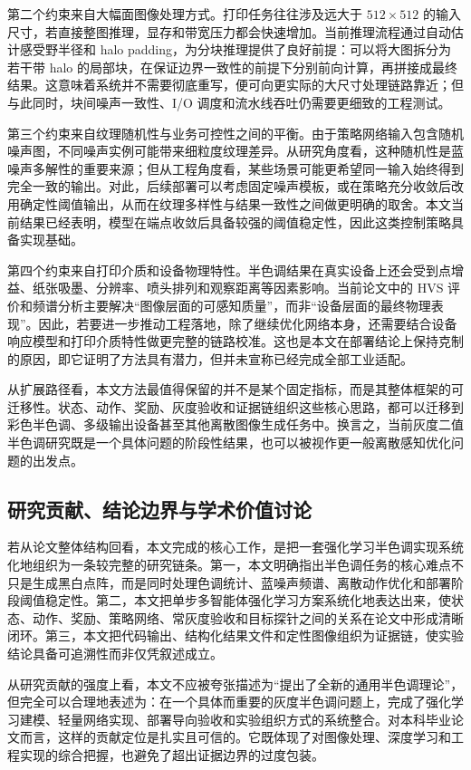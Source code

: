 \documentclass[thesis]{../zstucs-graduation-project}
\begin{document}
第二个约束来自大幅面图像处理方式。打印任务往往涉及远大于 $512\times512$ 的输入尺寸，若直接整图推理，显存和带宽压力都会快速增加。当前推理流程通过自动估计感受野半径和 halo padding，为分块推理提供了良好前提：可以将大图拆分为若干带 halo 的局部块，在保证边界一致性的前提下分别前向计算，再拼接成最终结果。这意味着系统并不需要彻底重写，便可向更实际的大尺寸处理链路靠近；但与此同时，块间噪声一致性、I/O 调度和流水线吞吐仍需要更细致的工程测试。

第三个约束来自纹理随机性与业务可控性之间的平衡。由于策略网络输入包含随机噪声图，不同噪声实例可能带来细粒度纹理差异。从研究角度看，这种随机性是蓝噪声多解性的重要来源；但从工程角度看，某些场景可能更希望同一输入始终得到完全一致的输出。对此，后续部署可以考虑固定噪声模板，或在策略充分收敛后改用确定性阈值输出，从而在纹理多样性与结果一致性之间做更明确的取舍。本文当前结果已经表明，模型在端点收敛后具备较强的阈值稳定性，因此这类控制策略具备实现基础。

第四个约束来自打印介质和设备物理特性。半色调结果在真实设备上还会受到点增益、纸张吸墨、分辨率、喷头排列和观察距离等因素影响。当前论文中的 HVS 评价和频谱分析主要解决“图像层面的可感知质量”，而非“设备层面的最终物理表现”。因此，若要进一步推动工程落地，除了继续优化网络本身，还需要结合设备响应模型和打印介质特性做更完整的链路校准。这也是本文在部署结论上保持克制的原因，即它证明了方法具有潜力，但并未宣称已经完成全部工业适配。

从扩展路径看，本文方法最值得保留的并不是某个固定指标，而是其整体框架的可迁移性。状态、动作、奖励、灰度验收和证据链组织这些核心思路，都可以迁移到彩色半色调、多级输出设备甚至其他离散图像生成任务中。换言之，当前灰度二值半色调研究既是一个具体问题的阶段性结果，也可以被视作更一般离散感知优化问题的出发点。

\subsection{研究贡献、结论边界与学术价值讨论}
若从论文整体结构回看，本文完成的核心工作，是把一套强化学习半色调实现系统化地组织为一条较完整的研究链条。第一，本文明确指出半色调任务的核心难点不只是生成黑白点阵，而是同时处理色调统计、蓝噪声频谱、离散动作优化和部署阶段阈值稳定性。第二，本文把单步多智能体强化学习方案系统化地表达出来，使状态、动作、奖励、策略网络、常灰度验收和目标探针之间的关系在论文中形成清晰闭环。第三，本文把代码输出、结构化结果文件和定性图像组织为证据链，使实验结论具备可追溯性而非仅凭叙述成立。

从研究贡献的强度上看，本文不应被夸张描述为“提出了全新的通用半色调理论”，但完全可以合理地表述为：在一个具体而重要的灰度半色调问题上，完成了强化学习建模、轻量网络实现、部署导向验收和实验组织方式的系统整合。对本科毕业论文而言，这样的贡献定位是扎实且可信的。它既体现了对图像处理、深度学习和工程实现的综合把握，也避免了超出证据边界的过度包装。
\end{document}
